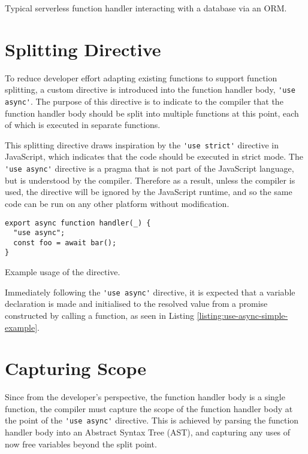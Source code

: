 \begin{listing}[H]
  \inputminted{javascript}{node_modules/@faaas-bench/hello-seq/src/onHttpGetHello.trigger.ts}
  \caption{Typical serverless function handler interacting with a database via an ORM.}
\end{listing}

\section{Splitting Directive}

To reduce developer effort adapting existing functions to support function splitting, a custom directive is introduced into the function handler body, \verb|'use async'|. The purpose of this directive is to indicate to the \faaasc{} compiler that the function handler body should be split into multiple functions at this point, each of which is executed in separate \awslambda{} functions.

This splitting directive draws inspiration by the \verb|'use strict'| directive in JavaScript, which indicates that the code should be executed in strict mode. The \verb|'use async'| directive is a pragma that is not part of the JavaScript language, but is understood by the \faaasc{} compiler. Therefore as a result, unless the \faaasc{} compiler is used, the directive will be ignored by the JavaScript runtime, and so the same code can be run on any other \faas{} platform without modification.

\begin{listing}[H]
\begin{verbatim}
export async function handler(_) {
  "use async";
  const foo = await bar();
}
\end{verbatim}
\caption{Example usage of the directive.}
\label{listing:use-async-simple-example}
\end{listing}

Immediately following the \verb|'use async'| directive, it is expected that a variable declaration is made and initialised to the resolved value from a promise constructed by calling a function, as seen in Listing \ref{listing:use-async-simple-example}.

\section{Capturing Scope}

Since from the developer's perspective, the function handler body is a single function, the \faaasc{} compiler must capture the scope of the function handler body at the point of the \verb|'use async'| directive. This is achieved by parsing the function handler body into an Abstract Syntax Tree (AST), and capturing any uses of now free variables beyond the split point.

